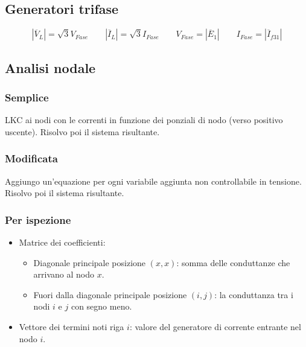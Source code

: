 \documentclass[10pt]{article}
\begin{document}
    \subsection*{Generatori trifase}

        \[
            |\overline{V}_L| = \sqrt{3} V_{Fase} \qquad |\overline{I}_L| = \sqrt{3} I_{Fase} \qquad V_{Fase} = |\overline{E}_1| \qquad I_{Fase} = |\overline{I}_{f31}|
        \]

    \newpage

    \subsection*{Analisi nodale}
    \vspace{-1.5\baselineskip}

        \begin{multicols}{2}
            
            \subsubsection*{Semplice}
            
                LKC ai nodi con le correnti in funzione dei ponziali di nodo (verso positivo uscente).
                Risolvo poi il sistema risultante.

            \subsubsection*{Modificata}

                Aggiungo un'equazione per ogni variabile aggiunta non controllabile in tensione.
                Risolvo poi il sistema risultante.

            \vfill\null
            \columnbreak

            \subsubsection*{Per ispezione}

                \begin{itemize}
                    \item Matrice dei coefficienti:
                        \begin{itemize}
                            \item Diagonale principale posizione \((x,x)\): somma delle conduttanze che arrivano al nodo \(x\).
                            \item Fuori dalla diagonale principale posizione \((i,j)\): la conduttanza tra i nodi \(i\) e \(j\) con segno meno.
                        \end{itemize}
                    \item Vettore dei termini noti riga \(i\): valore del generatore di corrente entrante nel nodo \(i\).
                \end{itemize}

        \end{multicols}
\end{document}
